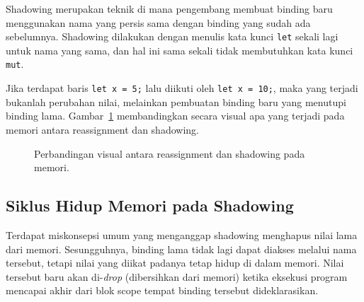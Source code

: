 \documentclass[11pt,a4paper]{article}
\begin{document}
Shadowing merupakan teknik di mana pengembang membuat binding baru menggunakan nama yang persis sama dengan binding yang sudah ada sebelumnya. Shadowing dilakukan dengan menulis kata kunci \texttt{let} sekali lagi untuk nama yang sama, dan hal ini sama sekali tidak membutuhkan kata kunci \texttt{mut}.

Jika terdapat baris \texttt{let x = 5;} lalu diikuti oleh \texttt{let x = 10;}, maka yang terjadi bukanlah perubahan nilai, melainkan pembuatan binding baru yang menutupi binding lama. Gambar~\ref{fig:shadowing} membandingkan secara visual apa yang terjadi pada memori antara reassignment dan shadowing.

\begin{figure}[H]
	\centering
	\caption{Perbandingan visual antara reassignment dan shadowing pada memori.}
	\label{fig:shadowing}
\end{figure}

\subsection{Siklus Hidup Memori pada Shadowing}

Terdapat miskonsepsi umum yang menganggap shadowing menghapus nilai lama dari memori. Sesungguhnya, binding lama tidak lagi dapat diakses melalui nama tersebut, tetapi nilai yang diikat padanya tetap hidup di dalam memori. Nilai tersebut baru akan di-\textit{drop} (dibersihkan dari memori) ketika eksekusi program mencapai akhir dari blok scope tempat binding tersebut dideklarasikan.
\end{document}
